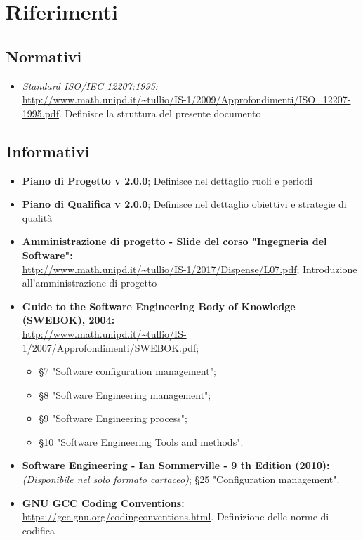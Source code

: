 \documentclass[./NormediProgetto.tex]{subfiles}
\begin{document}
\section{Riferimenti}

\subsection*{Normativi}

\begin{itemize}
	\item \textit{Standard ISO/IEC 12207:1995:}\\
	 \url{http://www.math.unipd.it/~tullio/IS-1/2009/Approfondimenti/ISO_12207-1995.pdf}.
	 \subitem Definisce la struttura del presente documento
\end{itemize}

\subsection*{Informativi}

\begin{itemize}
	\item \textbf{Piano di Progetto v 2.0.0};
		\subitem Definisce nel dettaglio ruoli e periodi
	\item \textbf{Piano di Qualifica v 2.0.0};
		\subitem Definisce nel dettaglio obiettivi e strategie di qualità
	\item \textbf{Amministrazione di progetto - Slide del corso "Ingegneria del Software":}\\	\url{http://www.math.unipd.it/~tullio/IS-1/2017/Dispense/L07.pdf};
		\subitem Introduzione all'amministrazione di progetto
	\item \textbf{Guide to the Software Engineering Body of Knowledge (SWEBOK), 2004:}\\
	\url{http://www.math.unipd.it/~tullio/IS-1/2007/Approfondimenti/SWEBOK.pdf}; 
		\begin{itemize}
			\item §7 "Software configuration management";
			\item §8 "Software Engineering management";
			\item §9 "Software Engineering process";
			\item §10 "Software Engineering Tools and methods".
		\end{itemize}
	\item \textbf{Software Engineering - Ian Sommerville - 9 th Edition (2010):}
		\subitem \textit{(Disponibile nel solo formato cartaceo)};
		\subitem §25 "Configuration management".
	\item \textbf{GNU GCC Coding Conventions:}\\ \url{https://gcc.gnu.org/codingconventions.html}.
		\subitem Definizione delle norme di codifica
\end{itemize}
\end{document}
